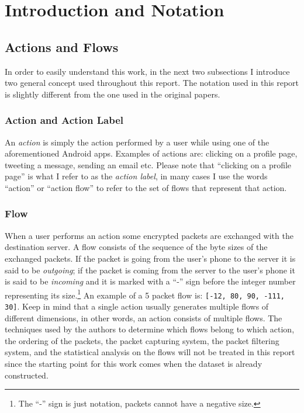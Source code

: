 \section{Introduction and Notation}
\label{sec:intro}

\subsection{Actions and Flows}
\label{subsec:flows}
In order to easily understand this work, in the next two subsections I introduce two general concept used throughout this report. The notation used in this report is slightly different from the one used in the original papers.

\subsubsection{Action and Action Label}
An \textit{action} is simply the action performed by a user while using one of the aforementioned Android apps. Examples of actions are: clicking on a profile page, tweeting a message, sending an email etc. Please note that ``clicking on a profile page'' is what I refer to as the \textit{action label}, in many cases I use the words ``action'' or ``action flow'' to refer to the set of flows that represent that action.

\subsubsection{Flow}
When a user performs an action some encrypted packets are exchanged with the destination server. A flow consists of the sequence of the byte sizes of the exchanged packets. If the packet is going from the user's phone to the server it is said to be \textit{outgoing}; if the packet is coming from the server to the user's phone it is said to be \textit{incoming} and it is marked with a ``-'' sign before the integer number representing its size.\footnote{The ``-'' sign is just notation, packets cannot have a negative size.} An example of a 5 packet flow is: \texttt{[-12, 80, 90, -111, 30]}. Keep in mind that a single action  usually generates multiple flows of different dimensions, in other words, an action consists of multiple flows. The techniques used by the authors to determine which flows belong to which action, the ordering of the packets, the packet capturing system, the packet filtering system, and the statistical analysis on the flows will not be treated in this report since the starting point for this work comes when the dataset is already constructed.

